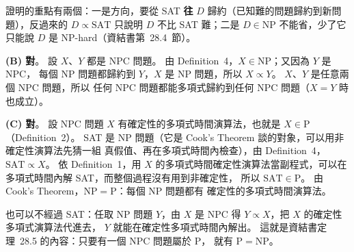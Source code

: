 \begin{pastsoln}
證明的重點有兩個：一是方向，要從 SAT \textbf{往} $D$ 歸約（已知難的問題歸約到新問題），反過來的
$D \propto \mathrm{SAT}$ 只說明 $D$ 不比 SAT 難；二是 $D \in \mathrm{NP}$ 不能省，少了它只能說 $D$ 是
NP-hard（資結書第~28.4~節）。

\textbf{(B) 對}。 設 $X$、$Y$ 都是 NPC 問題。 由 Definition~4，$X \in \mathrm{NP}$；又因為 $Y$ 是 NPC，
每個 NP 問題都歸約到 $Y$，$X$ 是 NP 問題，所以 $X \propto Y$。 $X$、$Y$ 是任意兩個 NPC 問題，所以
任何 NPC 問題都能多項式歸約到任何 NPC 問題（$X = Y$ 時也成立）。

\textbf{(C) 對}。 設 NPC 問題 $X$ 有確定性的多項式時間演算法，也就是 $X \in \mathrm{P}$
（Definition~2）。 SAT 是 NP 問題（它是 Cook's Theorem 談的對象，可以用非確定性演算法先猜一組
真假值、再在多項式時間內檢查），由 Definition~4，$\mathrm{SAT} \propto X$。 依 Definition~1，用 $X$
的多項式時間確定性演算法當副程式，可以在多項式時間內解 SAT，而整個過程沒有用到非確定性，
所以 $\mathrm{SAT} \in \mathrm{P}$。 由 Cook's Theorem，$\mathrm{NP} = \mathrm{P}$：每個 NP 問題都有
確定性的多項式時間演算法。

也可以不經過 SAT：任取 NP 問題 $Y$，由 $X$ 是 NPC 得 $Y \propto X$，把 $X$ 的確定性多項式演算法代進去，
$Y$ 就能在確定性多項式時間內解出。 這就是資結書定理~28.5 的內容：只要有一個 NPC 問題屬於 P，
就有 $\mathrm{P} = \mathrm{NP}$。
\end{pastsoln}
